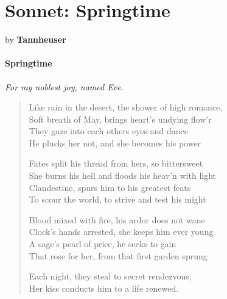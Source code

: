 \section{Sonnet: Springtime}

by \textbf{Tannheuser}

\paragraph{Springtime}

\emph{For my noblest joy, named Eve.}

\begin{verse}
Like rain in the desert, the shower of high romance,\\ Soft breath of May, brings heart's undying flow'r\\ They gaze into each others eyes and dance\\ He plucks her not, and she becomes his power

Fates split his thread from hers, so bittersweet\\ She burns his hell and floods his heav'n with light\\ Clandestine, spurs him to his greatest feats\\ To scour the world, to strive and test his might

Blood mixed with fire, his ardor does not wane\\ Clock's hands arrested, she keeps him ever young\\ A sage's pearl of price, he seeks to gain\\ That rose for her, from that first garden sprung

Each night, they steal to secret rendezvous;\\ Her kiss conducts him to a life renewed.
\end{verse}





